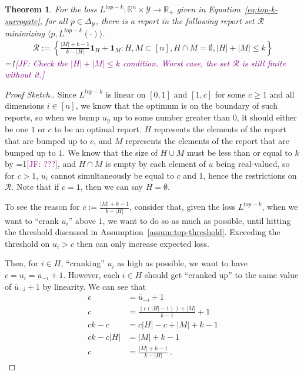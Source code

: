 \documentclass[12pt]{article}
\newcommand{\Comments}{1}
\newcommand{\mynote}[2]{\ifnum\Comments=1\textcolor{#1}{#2}\fi}
\newcommand{\jessie}[1]{\mynote{purple}{[JF: #1]}}
\newcommand{\reals}{\mathbb{R}}
\newcommand{\simplex}{\Delta_\Y}
\newcommand{\R}{\mathcal{R}}
\newcommand{\Y}{\mathcal{Y}}
\newcommand{\inprod}[2]{\langle #1, #2 \rangle}%
\newtheorem{theorem}{Theorem}
\begin{document}
\begin{theorem}\label{thm:finite-set}
	For the loss $L^{top-k} : \reals^n \times \Y \to \reals_+$ given in Equation~\ref{eq:top-k-surrogate}, for all $p \in \simplex$, there is a report in the following report set $\R$ minimizing $\inprod{p}{L^{top-k}(\cdot)}$.
	\begin{align*}
	\R := \left\{ \frac{|M| + k -1}{k - |H|} \mathbf{1}_H + \mathbf{1}_M : H, M \subset [n], H\cap M = \emptyset, |H| + |M| \leq k \right\}
	\end{align*}
	\jessie{Check the $|H|+|M| \leq k$ condition. Worst case, the set $\R$ is still finite without it.}
\end{theorem}
\begin{proof}[Proof Sketch.]
	Since $L^{top-k}$ is linear on $[0,1]$ and $[1, c]$ for some $c \geq 1$ and all dimensions $i \in [n]$, we know that the optimum is on the boundary of such reports, so when we bump $u_y$ up to some number greater than $0$, it should either be one $1$ or $c$ to be an optimal report.
	$H$ represents the elements of the report that are bumped up to $c$, and $M$ represents the elements of the report that are bumped up to $1$.
	We know that the size of $H \cup M$ must be less than or equal to $k$ by \jessie{???}, and $H \cap M$ is empty by each element of $u$ being real-valued, so for $c > 1$, $u_i$ cannot simultaneously be equal to $c$ and $1$, hence the restrictions on $\R$.
	Note that if $c = 1$, then we can say $H = \emptyset$.
	
	To see the reason for $c := \frac{|M| + k -1}{k - |H|}$, consider that, given the loss $L^{top-k}$, when we want to ``crank $u_i$'' above $1$, we want to do so as much as possible, until hitting the threshold discussed in Assumption~\ref{assum:top-threshold}.
	Exceeding the threshold on $u_i > c$ then can only increase expected loss.
	
	Then, for $i \in H$, ``cranking'' $u_i$ as high as possible, we want to have $c = u_i = \bar u _{-i} + 1$.
	However, each $i \in H$ should get ``cranked up'' to the same value of $\bar u_{-i} + 1$ by linearity.
	We can see that 
	\begin{align*}
	c &= \bar u_{-i} + 1 \\
	c &= \frac{(c (|H|-1)) + |M|}{k-1} + 1\\
	ck-c &= c|H| - c + |M| + k - 1\\
	ck - c|H| &= |M| + k - 1\\
	c &= \frac{|M|+k-1}{k-|H|}~.~
	\end{align*}
\end{proof}
\end{document}
